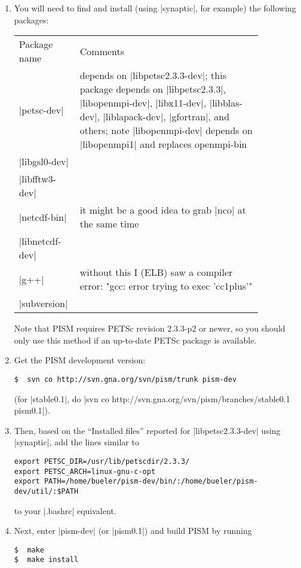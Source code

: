 \documentclass[11pt,final]{amsart}
\newcommand{\PETSCREL}{2.3.3-p2}
\begin{document}
\begin{enumerate}
\item You will need to find and install (using |synaptic|, for example) the following packages:
  \begin{center}
    \begin{tabular*}{0.9\linewidth}{p{0.15\linewidth}p{0.7\linewidth}}
      \hline
      Package name & Comments\\
      |petsc-dev| & depends on |libpetsc2.3.3-dev|; this package 
      depends on |libpetsc2.3.3|, |libopenmpi-dev|, |libx11-dev|,
      |libblas-dev|, |liblapack-dev|, |gfortran|, and others; 
      note |libopenmpi-dev| depends on |libopenmpi1| and
      replaces openmpi-bin\\
      |libgsl0-dev| & \\
      |libfftw3-dev| & \\
      |netcdf-bin| & it might be a good idea to grab |nco| at the same time\\
      |libnetcdf-dev| & \\
      |g++| & without this I (ELB) saw a compiler error: "gcc: error trying to exec 'cc1plus'"\\
      |subversion| & \\
      \hline
    \end{tabular*}
  \end{center}
  Note that PISM requires PETSc revision \PETSCREL{} or newer, so you should only use this method if an up-to-date PETSc package is
  available.
\item Get the PISM development version:
\begin{verbatim}
$  svn co http://svn.gna.org/svn/pism/trunk pism-dev
\end{verbatim}
(for |stable0.1|, do |svn co http://svn.gna.org/svn/pism/branches/stable0.1 pism0.1|).
\item Then, based on the ``Installed files'' reported for |libpetsc2.3.3-dev| using |synaptic|, add the lines similar to
\begin{verbatim}
export PETSC_DIR=/usr/lib/petscdir/2.3.3/
export PETSC_ARCH=linux-gnu-c-opt
export PATH=/home/bueler/pism-dev/bin/:/home/bueler/pism-dev/util/:$PATH
\end{verbatim}
  to your |.bashrc| equivalent.
\item Next, enter |pism-dev| (or |pism0.1|) and build PISM by running
\begin{verbatim}
$  make
$  make install
\end{verbatim}
\end{enumerate}
\end{document}
